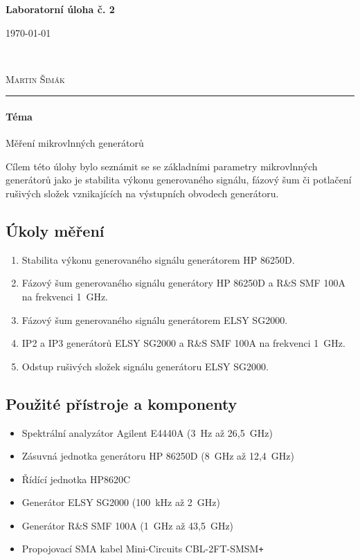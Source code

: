 \documentclass[11pt,a4paper]{article}
\newcommand{\plus}{{\texttt{+}}}
\begin{document}

\begin{center}
    {\LARGE\textbf{Laboratorní úloha č. 2}}\\[3mm]
    \begin{minipage}{0.4\textwidth}
        \begin{flushleft}
            \textsc{\today}
        \end{flushleft}
    \end{minipage}
    ~
    \begin{minipage}{0.4\textwidth}
        \begin{flushright}
            \textsc{Martin Šimák}
        \end{flushright}
    \end{minipage}
    \noindent\rule{14.5cm}{0.4pt}
\end{center}

\paragraph*{Téma} Měření mikrovlnných generátorů

Cílem této úlohy bylo seznámit se se základními parametry mikrovlnných generátorů jako je stabilita výkonu generovaného signálu, fázový šum či potlačení rušivých složek vznikajících na výstupních obvodech generátoru.

\subsection*{Úkoly měření}
\begin{enumerate}
    \item Stabilita výkonu generovaného signálu generátorem HP 86250D.
    \item Fázový šum generovaného signálu generátory HP 86250D a R\&S SMF 100A na frekvenci 1~GHz.
    \item Fázový šum generovaného signálu generátorem ELSY SG2000.
    \item IP2 a IP3 generátorů ELSY SG2000 a R\&S SMF 100A na frekvenci 1~GHz.
    \item Odstup rušivých složek signálu generátoru ELSY SG2000.
\end{enumerate}

\subsection*{Použité přístroje a komponenty}
\begin{itemize}
    \item Spektrální analyzátor Agilent E4440A (3~Hz až 26,5~GHz)
    \item Zásuvná jednotka generátoru HP 86250D (8~GHz až 12,4~GHz)
    \item Řídící jednotka HP8620C
    \item Generátor ELSY SG2000 (100~kHz až 2~GHz)
    \item Generátor R\&S SMF 100A (1~GHz až 43,5~GHz)
    \item Propojovací SMA kabel Mini-Circuits CBL-2FT-SMSM\plus
\end{itemize}
\end{document}
